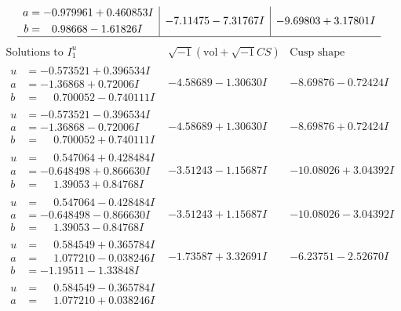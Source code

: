 \documentclass[1p]{elsarticle_modified}
\theoremstyle{definition}
\newcommand{\I}{\sqrt{-1}}
\begin{document}
$$\begin{array}{c|c|c}
\begin{aligned}
a &= -0.979961 + 0.460853 I \\
b &= \phantom{-}0.98668 - 1.61826 I\end{aligned}
 & -7.11475 - 7.31767 I & -9.69803 + 3.17801 I\\
 \hline 
 \end{array}$$\newpage$$\begin{array}{c|c|c}  
\text{Solutions to }I^u_{1}& \I (\text{vol} + \sqrt{-1}CS) & \text{Cusp shape}\\
 \hline 
\begin{aligned}
u &= -0.573521 + 0.396534 I \\
a &= -1.36868 + 0.72006 I \\
b &= \phantom{-}0.700052 - 0.740111 I\end{aligned}
 & -4.58689 - 1.30630 I & -8.69876 - 0.72424 I \\ \hline\begin{aligned}
u &= -0.573521 - 0.396534 I \\
a &= -1.36868 - 0.72006 I \\
b &= \phantom{-}0.700052 + 0.740111 I\end{aligned}
 & -4.58689 + 1.30630 I & -8.69876 + 0.72424 I \\ \hline\begin{aligned}
u &= \phantom{-}0.547064 + 0.428484 I \\
a &= -0.648498 + 0.866630 I \\
b &= \phantom{-}1.39053 + 0.84768 I\end{aligned}
 & -3.51243 - 1.15687 I & -10.08026 + 3.04392 I \\ \hline\begin{aligned}
u &= \phantom{-}0.547064 - 0.428484 I \\
a &= -0.648498 - 0.866630 I \\
b &= \phantom{-}1.39053 - 0.84768 I\end{aligned}
 & -3.51243 + 1.15687 I & -10.08026 - 3.04392 I \\ \hline\begin{aligned}
u &= \phantom{-}0.584549 + 0.365784 I \\
a &= \phantom{-}1.077210 - 0.038246 I \\
b &= -1.19511 - 1.33848 I\end{aligned}
 & -1.73587 + 3.32691 I & -6.23751 - 2.52670 I \\ \hline\begin{aligned}
u &= \phantom{-}0.584549 - 0.365784 I \\
a &= \phantom{-}1.077210 + 0.038246 I \\

\end{aligned}
\end{array}$$
\end{document}
